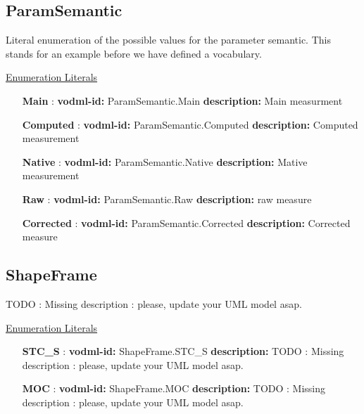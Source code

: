   \subsection{ParamSemantic}
  \label{sect:ParamSemantic}

  Literal enumeration of the possible values for the parameter semantic. This stands for an example before we have defined a vocabulary.

  \noindent \underline{Enumeration Literals}
  \vspace{-\parsep}
  \small
  \begin{itemize}
  
    \item[\textbf{Main}]: \textbf{vodml-id:} ParamSemantic.Main \newline
          \textbf{description:} Main measurment
    \item[\textbf{Computed}]: \textbf{vodml-id:} ParamSemantic.Computed \newline
          \textbf{description:} Computed measurement
    \item[\textbf{Native}]: \textbf{vodml-id:} ParamSemantic.Native \newline
          \textbf{description:} Mative measurement
    \item[\textbf{Raw}]: \textbf{vodml-id:} ParamSemantic.Raw \newline
          \textbf{description:} raw measure
    \item[\textbf{Corrected}]: \textbf{vodml-id:} ParamSemantic.Corrected \newline
          \textbf{description:} Corrected measure
  \end{itemize}
  \normalsize


  \subsection{ShapeFrame}
  \label{sect:ShapeFrame}

  TODO : Missing description : please, update your UML model asap.

  \noindent \underline{Enumeration Literals}
  \vspace{-\parsep}
  \small
  \begin{itemize}
  
    \item[\textbf{STC\_S}]: \textbf{vodml-id:} ShapeFrame.STC\_S \newline
          \textbf{description:} TODO : Missing description : please, update your UML model asap.
    \item[\textbf{MOC}]: \textbf{vodml-id:} ShapeFrame.MOC \newline
          \textbf{description:} TODO : Missing description : please, update your UML model asap.
  \end{itemize}
  \normalsize


